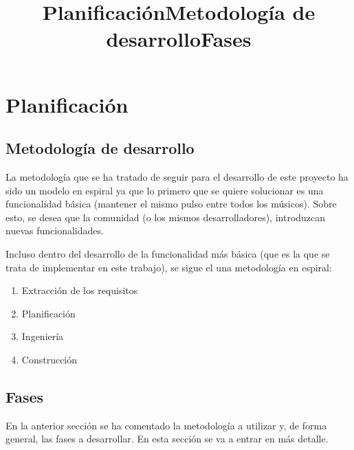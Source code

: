 \chapter{Planificación}
\title{Planificación}

\title{Metodología de desarrollo}
\section{Metodología de desarrollo}


La metodología que se ha tratado de seguir para el desarrollo de este proyecto ha sido
un modelo en espiral ya que lo primero que se quiere solucionar es una funcionalidad
básica (mantener el mismo pulso entre todos los músicos). Sobre esto,
se desea que la comunidad (o los mismos desarrolladores), introduzcan nuevas
funcionalidades.

Incluso dentro del desarrollo de la funcionalidad más básica (que es
la que se trata de implementar en este trabajo), se sigue el una metodología en espiral:

\begin{enumerate}
  \item Extracción de los requisitos
  \item Planificación
  \item Ingeniería
  \item Construcción
\end{enumerate}

\title{Fases}
\section{Fases}
En la anterior sección se ha comentado la metodología a utilizar y, de forma general,
las fases a desarrollar. En esta sección se va a entrar en más detalle.

